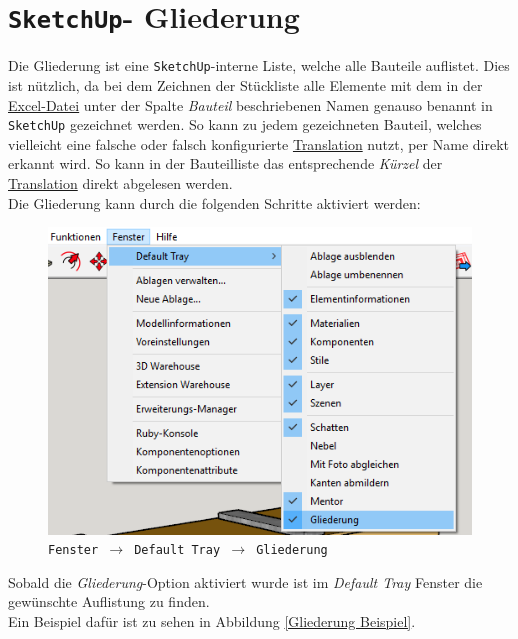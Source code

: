 \documentclass{book}
\newcommand{\sketchup}{\texttt{SketchUp}\xspace}
\begin{document}
		\section{\sketchup - Gliederung}
			Die Gliederung ist eine \sketchup-interne Liste, welche alle Bauteile auflistet. Dies ist nützlich, da bei dem Zeichnen der Stückliste alle Elemente mit dem in der \hyperref[excel]{Excel-Datei} unter der Spalte \textit{Bauteil} beschriebenen Namen genauso benannt in \sketchup gezeichnet werden. So kann zu jedem gezeichneten Bauteil, welches vielleicht eine falsche oder falsch konfigurierte \hyperref[Translation]{Translation} nutzt, per Name direkt erkannt wird. So kann in der Bauteilliste %
			das entsprechende \textit{Kürzel} der \hyperref[Translation]{Translation} direkt abgelesen werden.\\
			Die Gliederung kann durch die folgenden Schritte aktiviert werden:
			\begin{figure}[H]
				\centering
				\includegraphics[scale=0.6]{pics/Gliederung.png}\\
				\texttt{Fenster $\rightarrow$ Default Tray $\rightarrow$ Gliederung}							
			\end{figure}
			Sobald die \textit{Gliederung}-Option aktiviert wurde ist im \textit{Default Tray} Fenster die gewünschte Auflistung zu finden. \\
			Ein Beispiel dafür ist zu sehen in Abbildung \ref{Gliederung Beispiel}.
\end{document}
